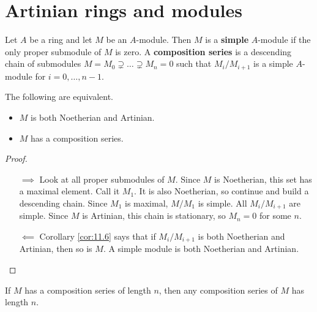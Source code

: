 \pagebreak

\section{Artinian rings and modules}


\begin{definition}
Let $ A $ be a ring and let $ M $ be an $ A $-module. Then $ M $ is a \textbf{simple} $ A $-module if the only proper submodule of $ M $ is zero. A \textbf{composition series} is a descending chain of submodules $ M = M_0 \supsetneq \dots \supsetneq M_n = 0 $ such that $ M_i / M_{i + 1} $ is a simple $ A $-module for $ i = 0, \dots, n - 1 $.
\end{definition}

\begin{proposition}
The following are equivalent.
\begin{itemize}
\item $ M $ is both Noetherian and Artinian.
\item $ M $ has a composition series.
\end{itemize}
\end{proposition}

\begin{proof}
\hfill
\begin{itemize}
\item[$ \implies $] Look at all proper submodules of $ M $. Since $ M $ is Noetherian, this set has a maximal element. Call it $ M_1 $. It is also Noetherian, so continue and build a descending chain. Since $ M_1 $ is maximal, $ M / M_1 $ is simple. All $ M_i / M_{i + 1} $ are simple. Since $ M $ is Artinian, this chain is stationary, so $ M_n = 0 $ for some $ n $.
\item[$ \impliedby $] Corollary \ref{cor:11.6} says that if $ M_i / M_{i + 1} $ is both Noetherian and Artinian, then so is $ M $. A simple module is both Noetherian and Artinian.
\end{itemize}
\end{proof}

\begin{proposition}
If $ M $ has a composition series of length $ n $, then any composition series of $ M $ has length $ n $.
\end{proposition}

